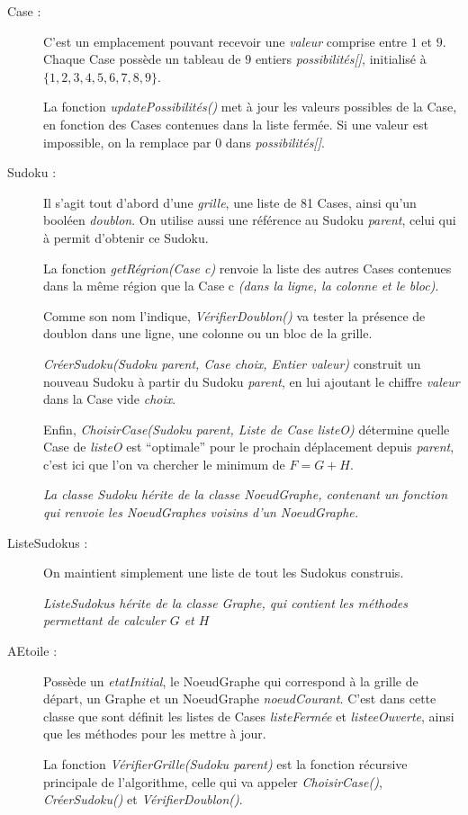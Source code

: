 \bigskip


\begin{description}
\item[Case :] 
C'est un emplacement pouvant recevoir une \textit{valeur} comprise entre $1$ et $9$. Chaque Case possède un tableau de $9$ entiers \textit{possibilités[]}, initialisé à $\{1,2,3,4,5,6,7,8,9\}$.

La fonction \textit{updatePossibilités()} met à jour les valeurs possibles de la Case, en fonction des Cases contenues dans la liste fermée. Si une valeur est impossible, on la remplace par $0$ dans \textit{possibilités[]}.


\item[Sudoku :] Il s'agit tout d'abord d'une \textit{grille}, une liste de 81 Cases, ainsi qu'un booléen \textit{doublon}. On utilise aussi une référence au Sudoku \textit{parent}, celui qui à permit d'obtenir ce Sudoku.

La fonction \textit{getRégrion(Case c)} renvoie la liste des autres Cases contenues dans la même région que la Case c \textit{(dans la ligne, la colonne et le bloc)}.

Comme son nom l'indique, \textit{VérifierDoublon()} va tester la présence de doublon dans une ligne, une colonne ou un bloc de la grille.

\textit{CréerSudoku(Sudoku parent, Case choix, Entier valeur)} construit un nouveau Sudoku à partir du Sudoku \textit{parent}, en lui ajoutant le chiffre \textit{valeur} dans la Case vide \textit{choix}.

Enfin, \textit{ChoisirCase(Sudoku parent, Liste de Case listeO)} détermine quelle Case de \textit{listeO} est ``optimale'' pour le prochain déplacement depuis \textit{parent}, c'est ici que l'on va chercher le minimum de $F=G+H$.

\textit{La classe Sudoku hérite de la classe NoeudGraphe, contenant un fonction qui renvoie les NoeudGraphes voisins d'un NoeudGraphe.}


\item[ListeSudokus : ] On maintient simplement une liste de tout les Sudokus construis.

\textit{ListeSudokus hérite de la classe Graphe, qui contient les méthodes permettant de calculer $G$ et $H$}

\item[AEtoile :] Possède un \textit{etatInitial}, le NoeudGraphe qui correspond à la grille de départ, un Graphe et un NoeudGraphe \textit{noeudCourant}. C'est dans cette classe que sont définit les listes de Cases \textit{listeFermée} et \textit{listeeOuverte}, ainsi que les méthodes pour les mettre à jour.

La fonction \textit{VérifierGrille(Sudoku parent)} est la fonction récursive principale de l'algorithme, celle qui va appeler \textit{ChoisirCase()}, \textit{CréerSudoku()} et \textit{VérifierDoublon()}.



\end{description}


